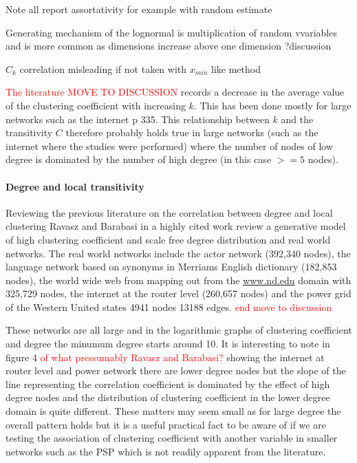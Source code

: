 Note all report assortativity for example with random estimate

Generating mechanism of the lognormal is multiplication of random vvariables and is more common as dimensions increase above one dimension \cite{} ?discussion \cite{koch1966logarithm}
\cite{limpert2001log}

$C_k$ correlation misleading if not taken with $x_{min}$ like method

\textcolor{red}{The literature MOVE TO DISCUSSION} records a decrease in the average value of the clustering coefficient with increasing $k$. This has been done mostly for large networks such as the internet \cite{newman2018networks} p 335.
This relationship between $k$ and the transitivity $C$ therefore probably holds true in large networks (such as the internet where the studies were performed) where the number of nodes of low degree is dominated by the number of high degree (in this case $>=5$ nodes). 

\paragraph{Degree and local transitivity}
\label{sec:discuss degree and local transitivity - summary just now}
Reviewing the previous literature on the correlation between degree and local clustering Ravasz and Barabasi in a highly cited work \cite{ravasz2002hierarchical} review a generative model of high clustering coefficient and scale free degree distribution and real world networks. The real world networks include the actor network (392,340 nodes), the language network based on synonyms in Merriams English dictionary (182,853 nodes), the world wide web from mapping out from the \url{www.nd.edu} domain with 325,729 nodes, the internet at the router level (260,657 nodes) and the power grid of the Western United states 4941 nodes 13188 edges. \textcolor{red}{end move to discussion}

These networks are all large and in the logarithmic graphs of clustering coefficient and degree the minumum degree starts around 10. It is interesting to note in figure 4 \textcolor{red}{of what pressumably Ravasz and Barabasi?} showing the internet at router level and power network there are lower degree nodes but the slope of the line representing the correlation coefficient is dominated by the effect of high degree nodes and the distribution of clustering coefficient in the lower degree domain is quite different. These matters may seem small as for large degree the overall pattern holds but it is a useful practical fact to be aware of if we are testing the association of clustering coefficient with another variable in smaller networks such as the PSP which is not readily apparent from the literature.

